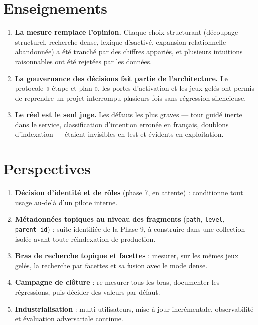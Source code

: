 \documentclass[a4paper,12pt]{report}
\begin{document}
\section*{Enseignements}
\begin{enumerate}
  \item \textbf{La mesure remplace l'opinion.} Chaque choix structurant (découpage structurel,
        recherche dense, lexique désactivé, expansion relationnelle abandonnée) a été tranché par
        des chiffres appariés, et plusieurs intuitions raisonnables ont été rejetées par les
        données.
  \item \textbf{La gouvernance des décisions fait partie de l'architecture.} Le protocole
        « étape et plan », les portes d'activation et les jeux gelés ont permis de reprendre un
        projet interrompu plusieurs fois sans régression silencieuse.
  \item \textbf{Le réel est le seul juge.} Les défauts les plus graves — tour guidé inerte dans le
        service, classification d'intention erronée en français, doublons d'indexation — étaient
        invisibles en test et évidents en exploitation.
\end{enumerate}

\section*{Perspectives}
\begin{enumerate}
  \item \textbf{Décision d'identité et de rôles} (phase 7, en attente) : conditionne tout usage
        au-delà d'un pilote interne.
  \item \textbf{Métadonnées topiques au niveau des fragments} (\texttt{path}, \texttt{level},
        \texttt{parent\_id}) : suite identifiée de la Phase 9, à construire dans une collection
        isolée avant toute réindexation de production.
  \item \textbf{Bras de recherche topique et facettes} : mesurer, sur les mêmes jeux gelés, la
        recherche par facettes et sa fusion avec le mode dense.
  \item \textbf{Campagne de clôture} : re-mesurer tous les bras, documenter les régressions, puis
        décider des valeurs par défaut.
  \item \textbf{Industrialisation} : multi-utilisateurs, mise à jour incrémentale, observabilité
        et évaluation adversariale continue.
\end{enumerate}
\end{document}
